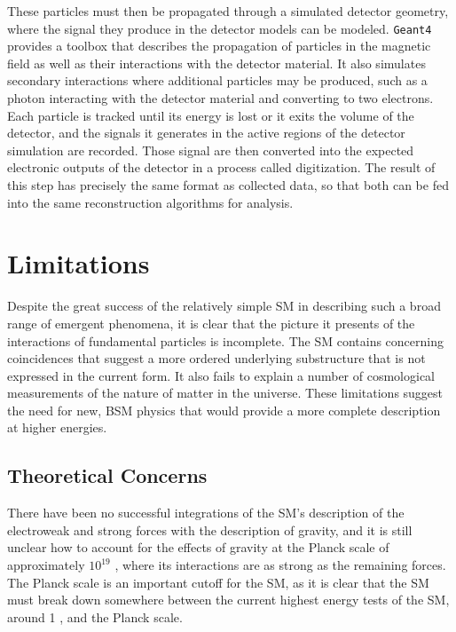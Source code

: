 These particles must then be propagated through a simulated detector geometry, where the signal they produce in the detector models can be modeled.
\texttt{Geant4}~\cite{GEANT4} provides a toolbox that describes the propagation of particles in the magnetic field as well as their interactions with the detector material.
It also simulates secondary interactions where additional particles may be produced, such as a photon interacting with the detector material and converting to two electrons.
Each particle is tracked until its energy is lost or it exits the volume of the detector, and the signals it generates in the active regions of the detector simulation are recorded.
Those signal are then converted into the expected electronic outputs of the detector in a process called digitization.
The result of this step has precisely the same format as collected data, so that both can be fed into the same reconstruction algorithms for analysis.

\section{Limitations}
\label{sec:limitations}

Despite the great success of the relatively simple \ac{SM} in describing such a broad range of emergent phenomena, it is clear that the picture it presents of the interactions of fundamental particles is incomplete.
The \ac{SM} contains concerning coincidences that suggest a more ordered underlying substructure that is not expressed in the current form.
It also fails to explain a number of cosmological measurements of the nature of matter in the universe.
These limitations suggest the need for new, \ac{BSM} physics that would provide a more complete description at higher energies.


\subsection{Theoretical Concerns}

There have been no successful integrations of the \ac{SM}'s description of the electroweak and strong forces with the description of gravity, and it is still unclear how to account for the effects of gravity at the Planck scale of approximately $10^{19}$ \GeV, where its interactions are as strong as the remaining forces.
The Planck scale is an important cutoff for the \ac{SM}, as it is clear that the \ac{SM} must break down somewhere between the current highest energy tests of the \ac{SM}, around 1 \TeV, and the Planck scale.

